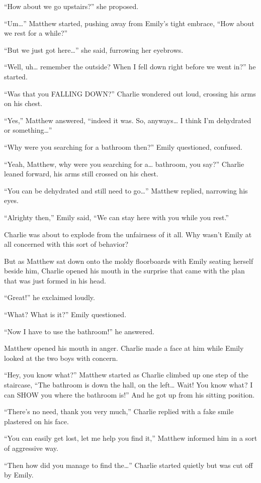“How about we go upstairs?” she proposed.

“Um…” Matthew started, pushing away from Emily’s tight embrace, “How about we rest for a while?”

“But we just got here…” she said, furrowing her eyebrows.

“Well, uh… remember the outside? When I fell down right before we went in?” he started.

“Was that you FALLING DOWN?” Charlie wondered out loud, crossing his arms on his chest.

“Yes,” Matthew answered, “indeed it was. So, anyways… I think I’m dehydrated or something…”

“Why were you searching for a bathroom then?” Emily questioned, confused.

“Yeah, Matthew, why were you searching for a… bathroom, you say?” Charlie leaned forward, his arms still crossed on his chest.

“You can be dehydrated and still need to go…” Matthew replied, narrowing his eyes.

“Alrighty then,” Emily said, “We can stay here with you while you rest.”

Charlie was about to explode from the unfairness of it all. Why wasn’t Emily at all concerned with this sort of behavior?

But as Matthew sat down onto the moldy floorboards with Emily seating herself beside him, Charlie opened his mouth in the surprise that came with the plan that was just formed in his head.

“Great!” he exclaimed loudly.

“What? What is it?” Emily questioned.

“Now I have to use the bathroom!” he answered.

Matthew opened his mouth in anger. Charlie made a face at him while Emily looked at the two boys with concern.

“Hey, you know what?” Matthew started as Charlie climbed up one step of the staircase, “The bathroom is down the hall, on the left… Wait! You know what? I can SHOW you where the bathroom is!” And he got up from his sitting position.

“There’s no need, thank you very much,” Charlie replied with a fake smile plastered on his face.

“You can easily get lost, let me help you find it,” Matthew informed him in a sort of aggressive way.

“Then how did you manage to find the…” Charlie started quietly but was cut off by Emily.

